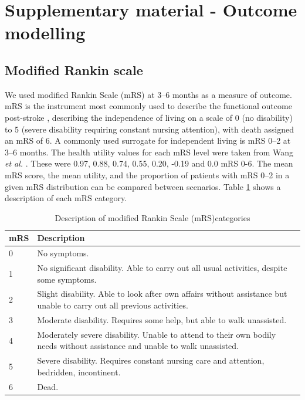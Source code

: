 
\section{Supplementary material - Outcome modelling}

\subsection{Modified Rankin scale}

We used modified Rankin Scale (mRS) at 3--6 months as a measure of outcome. mRS is the instrument most commonly used to describe the functional outcome post-stroke \cite{quinn_functional_2009}, describing the independence of living on a scale of 0 (no disability) to 5 (severe disability requiring constant nursing attention), with death assigned an mRS of 6. A commonly used surrogate for independent living is mRS 0--2 at 3--6 months. The health utility values for each mRS level were taken from Wang \textit{et al.} \cite{wang_utility-weighted_2020}. These were 0.97, 0.88, 0.74, 0.55, 0.20, -0.19 and 0.0 mRS 0-6. The mean mRS score, the mean utility, and the proportion of patients with mRS 0--2 in a given mRS distribution can be compared between scenarios. Table \ref{tab:mrs} shows a description of each mRS category.

\begin{minipage}{1.0\textwidth}  %
\begin{longtable}{p{1.2cm} p{13cm}}
\caption{Description of modified Rankin Scale (mRS)categories}\label{tab:mrs}\\
\toprule
mRS & Description \\
\midrule
0 & No symptoms. \\
1 & No significant disability. Able to carry out all usual activities, despite some symptoms.\\
2 & Slight disability. Able to look after own affairs without assistance but unable to carry out all previous activities. \\
3 & Moderate disability. Requires some help, but able to walk unassisted.\\
4 & Moderately severe disability. Unable to attend to their own bodily needs without assistance and unable to walk unassisted. \\
5 & Severe disability. Requires constant nursing care and attention,
bedridden, incontinent.\\
6 & Dead.\\
\bottomrule
\end{longtable}
\end{minipage} 


